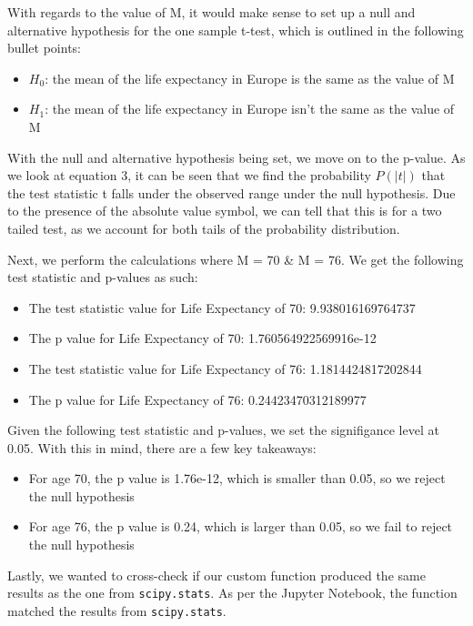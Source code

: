\documentclass[a4paper, twocolumn]{article}
\begin{document}
With regards to the value of M, it would make sense to set up a null and alternative hypothesis for the one sample
t-test, which is outlined in the following bullet points:

\begin{itemize}
    \item $H_0$: the mean of the life expectancy in Europe is the same as the value of M
    \item $H_1$: the mean of the life expectancy in Europe isn't the same as the value of M
\end{itemize}

With the null and alternative hypothesis being set, we move on to the p-value. As we look at equation 3, it can be
seen that we find the probability $P ( \left| t \right|)$ that the test statistic t falls under the observed range
under the null hypothesis. Due to the presence of the absolute value symbol, we can tell that this is for a two 
tailed test, as we account for both tails of the probability distribution.

Next, we perform the calculations where M = 70 \& M = 76. We get the following test statistic and p-values as such:
\begin{itemize}
    \raggedright
    \item The test statistic value for Life Expectancy of 70: 9.938016169764737 
    \item The p value for Life Expectancy of 70: 1.760564922569916e-12 
    \item The test statistic value for Life Expectancy of 76: 1.1814424817202844 
    \item The p value for Life Expectancy of 76: 0.24423470312189977 
\end{itemize}

Given the following test statistic and p-values, we set the signifigance level at 0.05. With this in mind, there are 
a few key takeaways:
\begin{itemize}
    \item For age 70, the p value is 1.76e-12, which is smaller than 0.05, so we reject the null hypothesis
    \item For age 76, the p value is 0.24, which is larger than 0.05, so we fail to reject the null hypothesis
\end{itemize}

Lastly, we wanted to cross-check if our custom function produced the same results as the one from 
\texttt{scipy.stats}. As per the Jupyter Notebook, the function matched the results from \texttt{scipy.stats}.
\end{document}
